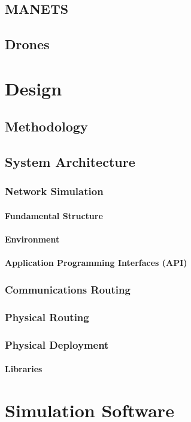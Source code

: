 \documentclass[12pt,a4paper,twoside]{report}
\begin{document}
	\section{MANETS}
	\section{Drones}	

\chapter{Design}
	\section{Methodology}
	\section{System Architecture}
		\subsection{Network Simulation}
			\subsubsection{Fundamental Structure}
			\subsubsection{Environment}
			\subsubsection{Application Programming Interfaces (API)}
		\subsection{Communications Routing}
		\subsection{Physical Routing} 
		\subsection{Physical Deployment}
			\subsubsection{Libraries}


\chapter{Simulation Software}
\end{document}
